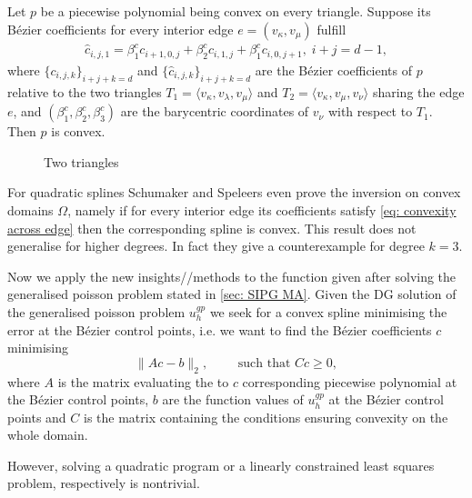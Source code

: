 \begin{theorem}
	Let $p$ be a piecewise polynomial being convex on every triangle. Suppose its B\'ezier coefficients for every interior edge $e =(v_\kappa, v_\mu)$ fulfill 
	\begin{align}
		{\hat c_{i,j,1}} = \beta_1^c c_{i+1, 0,j} +\beta_2^c c_{i,1,j} + \beta_1^c c_{i, 0,j+1}, \; i+j=d-1, \label{eq: convexity across edge}
	\end{align}
where  $\{c_{i,j,k}\}_{i+j+k=d}$ and $\{ {\hat c_{i,j,k}}\}_{i+j+k=d}$ are the B\'ezier coefficients of $p$ relative to the two triangles $T_1 = \langle v_\kappa, v_\lambda, v_\mu \rangle$ and $T_2 = \langle v_\kappa, v_\mu, v_\nu \rangle$ sharing the edge $e$, and $(\beta_1^c,\beta_2^c,\beta_3^c)$ are the barycentric coordinates of $v_\nu$ with respect to $T_1$. Then $p$ is convex.
\end{theorem}

\begin{figure}[h]
	
	\caption{Two triangles}
\end{figure}

For quadratic splines Schumaker and Speleers even prove the inversion on convex domains $\Omega$, namely if for every interior edge its coefficients satisfy \eqref{eq: convexity across edge} then the corresponding spline is convex.
This result does not generalise for higher degrees. In fact they give a counterexample for degree $k = 3$.

Now we apply the new insights//methods to the function given after solving the generalised poisson problem stated in \ref{sec: SIPG MA}.
Given the DG solution of the generalised poisson problem $u^{gp}_h$ we seek for a convex spline minimising the error at the B\'ezier control points, i.e. we want to find the B\'ezier coefficients $c$ minimising
\[
		\lVert A c - b \rVert_2, \qquad \text{ such that } Cc \geq 0,
\]
where $A$ is the matrix evaluating the to $c$ corresponding piecewise polynomial at the B\'ezier control points, $b$ are the function values of $u^{gp}_h$ at the B\'ezier control points and $C$ is the matrix containing the conditions ensuring convexity on the whole domain.

However, solving a quadratic program or a linearly constrained least squares problem, respectively is nontrivial. 

